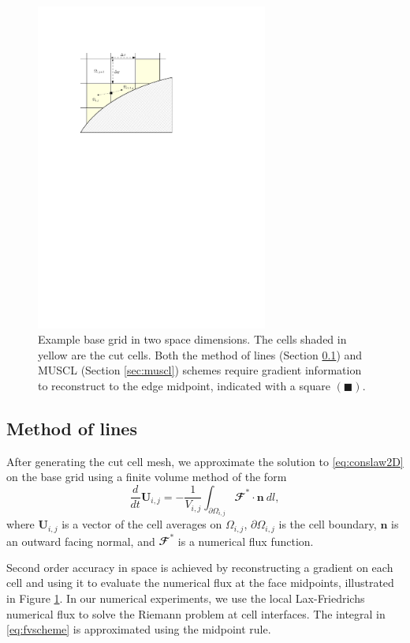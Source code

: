 \begin{figure}
\begin{center}
\includegraphics[width=3.0in]{figs/example_ccmesh.pdf}
\caption{\sf Example base grid in two space dimensions. The cells shaded
in yellow are the cut cells.  Both the method of lines (Section
\ref{sec:mol}) and MUSCL (Section \ref{sec:muscl}) schemes require
gradient information to reconstruct to the edge midpoint, indicated with
a square $(\blacksquare)$.} 
\label{fig:2dfig}
\end{center}
\end{figure}


\subsection{Method of lines} \label{sec:mol}

After generating the cut cell mesh, we approximate the solution to \eqref{eq:conslaw2D} on the base grid using a finite volume method of the form
\begin{equation}\label{eq:fvscheme}
\frac{d}{dt}\mathbf{U}_{i,j} =- \frac{1}{V_{i,j}} \int_{\partial \Omega_{i,j}} \mathbfcal{F} ^* \cdot \mathbf{n} ~dl,
\end{equation}
where $\mathbf{U}_{i,j}$ is a vector of the cell averages on $\Omega_{i,j}$, $\partial \Omega_{i,j}$ is the cell boundary, $\mathbf{n}$ is an outward facing normal, and $\mathbfcal{F}^*$ is a numerical flux function.

Second order accuracy in space is achieved by reconstructing a gradient on each
cell and using it to evaluate the numerical flux at the face midpoints,
illustrated in Figure \ref{fig:2dfig}.  
In our numerical experiments, we use the local Lax-Friedrichs numerical 
flux to solve the Riemann problem at cell interfaces. The integral in \eqref{eq:fvscheme} is  approximated using the midpoint rule.

